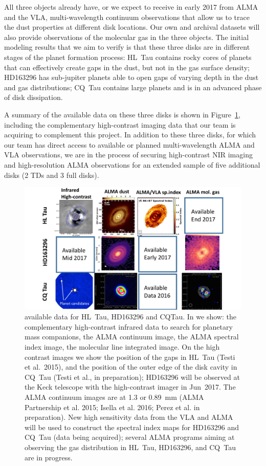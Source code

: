 \documentclass[10pt,fleqn,twoside]{article}
\begin{document}
All three objects already have, or we expect to receive in early 2017 from ALMA and the VLA, multi-wavelength continuum observations that allow us to trace the dust properties at different disk locations. Our own and archival datasets will also provide observations of the molecular gas in the three objects.
The initial modeling results that we aim to verify is that these three disks are in different stages of the planet formation process: HL~Tau contains rocky cores of planets that can effectively create gaps in the dust, but not in the gas surface density; HD163296 has sub-jupiter planets able to open gaps of varying depth in the dust and gas distributions; CQ~Tau contains large planets and is in an advanced phase of disk dissipation.

A summary of the available data on these three disks is shown in Figure~\ref{f_nir_alma}, including the complementary high-contrast imaging data that our team is acquiring to complement this project. In addition to these three disks, for which our team has direct access to available or planned multi-wavelength ALMA and VLA observations, we are in the process of securing high-contrast NIR imaging and high-resolution ALMA observations for an extended sample of five additional disks (2 TDs and 3 full disks).

\begin{figure}
\centerline{\includegraphics[scale=0.4,angle=0]{f_highres_data.pdf}}
\caption{ available data for HL~Tau,
  HD163296 and CQTau. In  we show: the
  complementary high-contrast infrared data to search for planetary mass
  companions, the ALMA continuum image, the ALMA spectral index image, the
  molecular line integrated image. On the high contrast images we show the
  position of the gaps in HL~Tau (Testi et al.~2015), and the position of
  the outer edge of the disk cavity in CQ~Tau (Testi et al., in
  preparation); HD163296 will be observed at the Keck telescope with the
  high-contrast imager in Jun~2017. The ALMA continuum images are at 1.3 or
  0.89~mm (ALMA Partnership et al. 2015; Isella et al. 2016; Perez et al. in
  preparation). New high sensitivity data from the VLA and ALMA will be used
  to construct the spectral index maps for HD163296 and CQ~Tau (data being
  acquired); several ALMA programs aiming at observing the gas distribution
  in HL~Tau, HD163296, and CQ~Tau are in progress.}
\label{f_nir_alma}
\end{figure}
\end{document}
